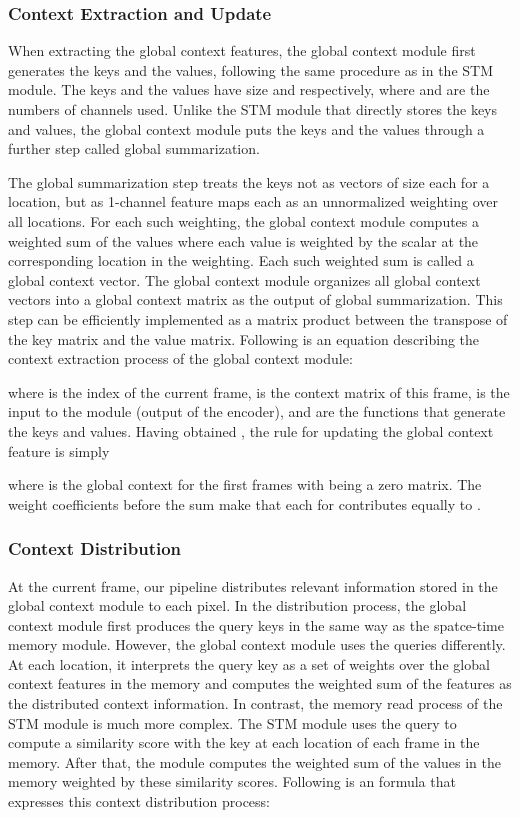 \documentclass[runningheads]{llncs}
\begin{document}
\subsubsection{Context Extraction and Update}

When extracting the global context features, the global context module first generates the keys and the values, following the same procedure as in the STM module. The keys and the values have size  and  respectively, where  and  are the numbers of channels used. Unlike the STM module that directly stores the keys and values, the global context module puts the keys and the values through a further step called global summarization.

The global summarization step treats the keys not as  vectors of size  each for a location, but as  1-channel feature maps each as an unnormalized weighting over all locations. For each such weighting, the global context module computes a weighted sum of the values where each value is weighted by the scalar at the corresponding location in the weighting. Each such weighted sum is called a global context vector. The global context module organizes all  global context vectors into a global context matrix as the output of global summarization. This step can be efficiently implemented as a matrix product between the transpose of the key matrix and the value matrix. Following is an equation describing the context extraction process of the global context module:

where  is the index of the current frame,  is the context matrix of this frame,  is the input to the module (output of the encoder), and  are the functions that generate the keys and values. Having obtained , the rule for updating the global context feature is simply

where  is the global context for the first  frames with  being a zero matrix. The weight coefficients before the sum make that each  for  contributes equally to .

\subsubsection{Context Distribution}
At the current frame, our pipeline distributes relevant information stored in the global context module to each pixel. In the distribution process, the global context module first produces the query keys in the same way as the spatce-time memory module. However, the global context module uses the queries differently. At each location, it interprets the query key as a set of weights over the global context features in the memory and computes the weighted sum of the features as the distributed context information. In contrast, the memory read process of the STM module is much more complex. The STM module uses the query to compute a similarity score with the key at each location of each frame in the memory. After that, the module computes the weighted sum of the values in the memory weighted by these similarity scores. Following is an formula that expresses this context distribution process:
\end{document}
